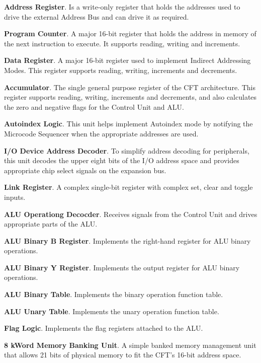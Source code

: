 \begin{description}
  \item{\bfseries Address Register}. Is a write-only register that holds the
    addresses used to drive the external Address Bus and can drive it as
    required.

  \item{\bfseries Program Counter}. A major 16-bit register that holds the
    address in memory of the next instruction to execute. It supports reading,
    writing and increments.

  \item{\bfseries Data Register}. A major 16-bit register used to implement
    Indirect \glspl{Addressing Mode}. This register supports reading, writing,
    increments and decrements.

  \item{\bfseries Accumulator}. The single general purpose register of the CFT
    architecture. This register supports reading, writing, increments and
    decrements, and also calculates the zero and negative flags for the Control
    Unit and \gls{ALU}.

  \item{\bfseries Autoindex Logic}. This unit helps implement Autoindex mode by
    notifying the Microcode Sequencer when the appropriate addresses are used.

  \item{\bfseries I/O Device Address Decoder}. To simplify address decoding for
    peripherals, this unit decodes the upper eight bits of the I/O address
    space and provides appropriate chip select signals on the expansion bus.

  \item{\bfseries Link Register}. A complex single-bit register with complex
    set, clear and toggle inputs.

  \item{\bfseries ALU Operationg Decocder}. Receives signals from the
    Control Unit and drives appropriate parts of the \gls{ALU}.

  \item{\bfseries ALU Binary B Register}. Implements the right-hand register
    for \gls{ALU} binary operations.

  \item{\bfseries ALU Binary Y Register}. Implements the output register
    for \gls{ALU} binary operations.

  \item{\bfseries ALU Binary Table}. Implements the binary operation function
    table.

  \item{\bfseries ALU Unary Table}. Implements the unary operation function
    table.

  \item{\bfseries Flag Logic}. Implements the flag registers attached to the
    \gls{ALU}.

  \item{\bfseries 8 kWord Memory Banking Unit}. A simple banked memory
    management unit that allows 21 bits of physical memory to fit the CFT's
    16-bit address space.

\end{description}

